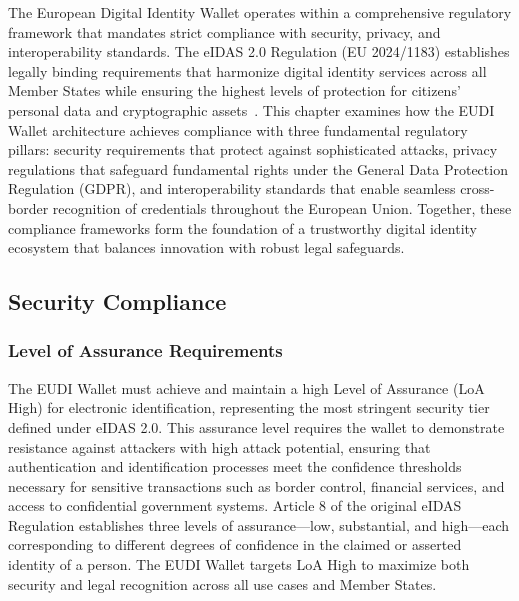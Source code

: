 \documentclass[sigconf,balance,nonacm,authordraft]{acmart}
\begin{document}
The European Digital Identity Wallet operates within a comprehensive regulatory framework that mandates strict compliance with security, privacy, and interoperability standards. The eIDAS 2.0 Regulation (EU 2024/1183) establishes legally binding requirements that harmonize digital identity services across all Member States while ensuring the highest levels of protection for citizens' personal data and cryptographic assets~\cite{EU_eIDAS2024}. This chapter examines how the EUDI Wallet architecture achieves compliance with three fundamental regulatory pillars: security requirements that protect against sophisticated attacks, privacy regulations that safeguard fundamental rights under the General Data Protection Regulation (GDPR), and interoperability standards that enable seamless cross-border recognition of credentials throughout the European Union. Together, these compliance frameworks form the foundation of a trustworthy digital identity ecosystem that balances innovation with robust legal safeguards.

\subsection{Security Compliance}

\subsubsection{Level of Assurance Requirements}

The EUDI Wallet must achieve and maintain a high Level of Assurance (LoA High) for electronic identification, representing the most stringent security tier defined under eIDAS 2.0. This assurance level requires the wallet to demonstrate resistance against attackers with high attack potential, ensuring that authentication and identification processes meet the confidence thresholds necessary for sensitive transactions such as border control, financial services, and access to confidential government systems. Article 8 of the original eIDAS Regulation establishes three levels of assurance—low, substantial, and high—each corresponding to different degrees of confidence in the claimed or asserted identity of a person. The EUDI Wallet targets LoA High to maximize both security and legal recognition across all use cases and Member States.
\end{document}

